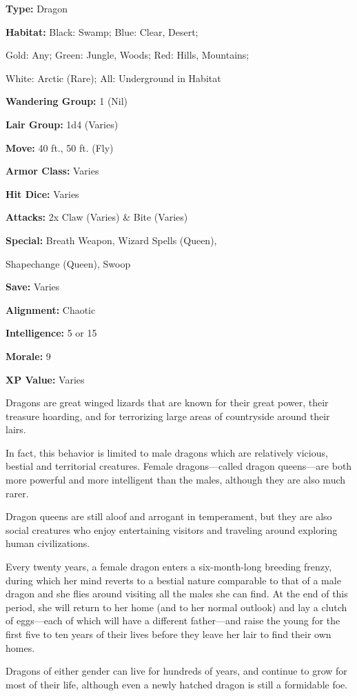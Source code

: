 \begin{multicols*}{2}
{\textbf{Type:} Dragon

\textbf{Habitat:} Black: Swamp; Blue: Clear, Desert; 

Gold: Any; Green: Jungle, Woods; Red: Hills, Mountains; 

White: Arctic (Rare); All: Underground in Habitat

\textbf{Wandering Group:} 1 (Nil)

\textbf{Lair Group:} 1d4 (Varies)

\textbf{Move:} 40 ft., 50 ft. (Fly)

\textbf{Armor Class:} Varies

\textbf{Hit Dice:} Varies

\textbf{Attacks:} 2x Claw (Varies) \& Bite (Varies)

\textbf{Special:} Breath Weapon, Wizard Spells (Queen), 

Shapechange (Queen), Swoop

\textbf{Save:} Varies

\textbf{Alignment:} Chaotic

\textbf{Intelligence:} 5 or 15

\textbf{Morale:} 9

\textbf{XP Value:} Varies}

Dragons are great winged lizards that are known for their great power, their treasure hoarding, and for terrorizing large areas of countryside around their lairs.

In fact, this behavior is limited to male dragons which are relatively vicious, bestial and territorial creatures. Female dragons—called dragon queens—are both more powerful and more intelligent than the males, although they are also much rarer.

Dragon queens are still aloof and arrogant in temperament, but they are also social creatures who enjoy entertaining visitors and traveling around exploring human civilizations.

Every twenty years, a female dragon enters a six-month-long breeding frenzy, during which her mind reverts to a bestial nature comparable to that of a male dragon and she flies around visiting all the males she can find. At the end of this period, she will return to her home (and to her normal outlook) and lay a clutch of eggs—each of which will have a different father—and raise the young for the first five to ten years of their lives before they leave her lair to find their own homes.

Dragons of either gender can live for hundreds of years, and continue to grow for most of their life, although even a newly hatched dragon is still a formidable foe.


\end{multicols*}

